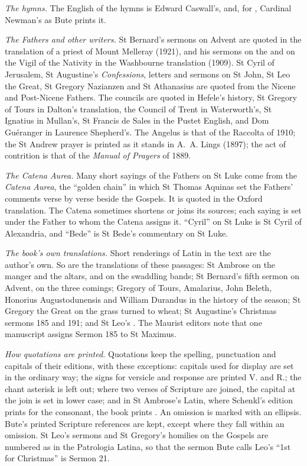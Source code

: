 \textit{The hymns.} The English of the hymns is Edward Caswall's, and, for
, Cardinal Newman's as Bute prints it.

\textit{The Fathers and other writers.} St Bernard's sermons on Advent are
quoted in the translation of a priest of Mount Melleray (1921), and his sermons
on the  and on the Vigil of the Nativity in the Washbourne
translation (1909). St Cyril of Jerusalem, St Augustine's \textit{Confessions}, letters and
sermons on St John, St Leo the Great, St Gregory Nazianzen and St Athanasius are quoted from the Nicene and
Post-Nicene Fathers. The councils are quoted in Hefele's history, St Gregory of
Tours in Dalton's translation, the Council of Trent in Waterworth's, St Ignatius in Mullan's, St Francis de Sales in the
Pustet English, and Dom Guéranger in Laurence Shepherd's. The Angelus is that
of the Raccolta of 1910; the St Andrew prayer is printed as it stands in A.~A.
Lings (1897); the act of contrition is that of the \textit{Manual of Prayers} of
1889.

\textit{The Catena Aurea.} Many short sayings of the Fathers on St Luke come
from the \textit{Catena Aurea}, the ``golden chain'' in which St Thomas Aquinas
set the Fathers' comments verse by verse beside the Gospels. It is quoted in
the Oxford translation. The Catena sometimes shortens or joins its sources; each
saying is set under the Father to whom the Catena assigns it. ``Cyril'' on St Luke is St Cyril of
Alexandria, and ``Bede'' is St Bede's commentary on St Luke.

\textit{The book's own translations.} Short renderings of Latin in the text
are the author's own. So are the translations of these passages: St Ambrose on
the manger and the altars, and on the swaddling bands; St Bernard's fifth
sermon on Advent, on the three comings; Gregory of Tours, Amalarius, John
Beleth, Honorius Augustodunensis and William Durandus in the history of the season; St
Gregory the Great on the grass turned to wheat; St Augustine's Christmas
sermons 185 and 191; and St Leo's . The Maurist
editors note that one manuscript assigns Sermon 185 to St Maximus.

\textit{How quotations are printed.} Quotations keep the spelling, punctuation
and capitals of their editions, with these exceptions: capitals used for
display are set in the ordinary way; the signs for versicle and response are
printed V. and R.; the chant asterisk is left out; where two verses of
Scripture are joined, the capital at the join is set in lower case; and in St
Ambrose's Latin, where Schenkl's edition prints  for the consonant,
the book prints . An omission is marked with an ellipsis. Bute's
printed Scripture references are kept, except where they fall within an
omission. St Leo's sermons and St Gregory's homilies on the Gospels are
numbered as in the Patrologia Latina, so that the sermon Bute calls Leo's ``1st
for Christmas'' is Sermon 21.

